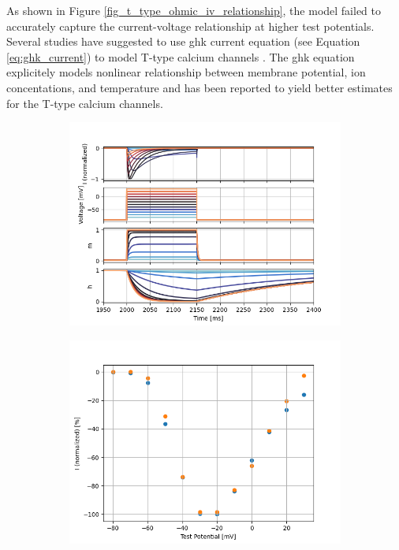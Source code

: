 \documentclass[../main.tex]{subfiles}
\begin{document}
As shown in Figure \ref{fig_t_type_ohmic_iv_relationship}, the model failed to accurately capture the current-voltage relationship at higher test potentials. Several studies have suggested to use \gls{ghk} current equation (see Equation \ref{eq:ghk_current}) to model T-type calcium channels \parencite{huguenardSimulationCurrentsInvolved1992}. The \gls{ghk} equation explicitely models nonlinear relationship between membrane potential, ion concentations, and temperature and has been reported to yield better estimates for the T-type calcium channels. %

\begin{figure}[!t]
    \centering
    \begin{subfigure}[t]{0.45\textwidth}
        \centering
        \includegraphics[width=\textwidth]{../../reports/workflow/img/t_type_calcium_channel/simulations/Scaling/Constant Field EquationVoltage Step Up-Down6_voltage_traces.png}
        \caption{}
        \label{fig_t_type_constant_field_voltage_traces_scaled}
    \end{subfigure}
    \hfill
    \begin{subfigure}[t]{0.45\textwidth}
        \centering
        \includegraphics[width=\textwidth]{../../reports/workflow/img/t_type_calcium_channel/simulations/Scaling/Constant Field EquationVoltage Step5_IV_Relationship_comparison_Jeong_2015.png}

\end{subfigure}
\end{figure}
\end{document}
